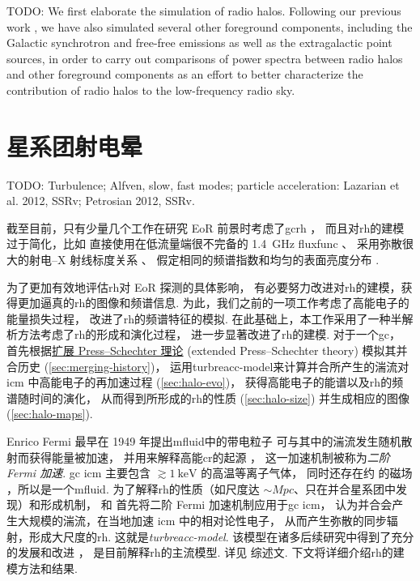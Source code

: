 TODO:
We first elaborate the simulation of radio halos.
Following our previous work \cite{wang2010}, we have also simulated
several other foreground components, including the Galactic synchrotron
and free-free emissions as well as the extragalactic point sources,
in order to carry out comparisons of power spectra between radio halos
and other foreground components as an effort to better characterize the
contribution of radio halos to the low-frequency radio sky.


\section{星系团射电晕}
\label{sec:radio-halos}

TODO: Turbulence; Alfven, slow, fast modes; particle acceleration:
Lazarian et al. 2012, SSRv;
Petrosian 2012, SSRv.

截至目前，只有少量几个工作在研究 EoR 前景时考虑了\ac{gc}\ac{rh}
\cite{diMatteo2004,gleser2008,jelic2008}，
而且对\ac{rh}的建模过于简化，比如
直接使用在低流量端很不完备的 \SI{1.4}{\GHz} \ac{fluxfunc} \cite{gleser2008}、
采用弥散很大的射电--X 射线标度关系 \cite{jelic2008}、
假定相同的频谱指数和均匀的表面亮度分布 \cite{gleser2008,jelic2008}.

为了更加有效地评估\ac{rh}对 EoR 探测的具体影响，
有必要努力改进对\ac{rh}的建模，获得更加逼真的\ac{rh}的图像和频谱信息.
为此，我们之前的一项工作\cite{wang2010}考虑了高能电子的能量损失过程，
改进了\ac{rh}的频谱特征的模拟.
在此基础上，本工作采用了一种半解析方法考虑了\ac{rh}的形成和演化过程，
进一步显著改进了\ac{rh}的建模.
对于一个\ac{gc}，
首先根据\uline{扩展 Press--Schechter 理论} (extended Press--Schechter theory)
模拟其并合历史 (\autoref{sec:merging-history})，
运用\ac{turbreacc-model}来计算并合所产生的湍流对
\ac{icm} 中高能电子的再加速过程 (\autoref{sec:halo-evo})，
获得高能电子的能谱以及\ac{rh}的频谱随时间的演化，
从而得到所形成的\ac{rh}的性质 (\autoref{sec:halo-size})
并生成相应的图像 (\autoref{sec:halo-maps}).

Enrico Fermi 最早在 1949 年提出\ac{mfluid}中的带电粒子
可与其中的湍流发生随机散射而获得能量被加速，
并用来解释高能\ac{cr}的起源 \cite{fermi1949,fermi1954,davis1956}，
这一加速机制被称为\emph{二阶 Fermi 加速}.
\ac{gc} \ac{icm} 主要包含 $\gtrsim \SI{1}{\keV}$ 的高温等离子气体，
同时还存在约 \si{\uG} 的磁场 \cite{govoni2004,ryu2008}，所以是一个\ac{mfluid}.
为了解释\ac{rh}的性质（如尺度达 $\sim\si{Mpc}$、只在并合星系团中发现）和形成机制，
 和 
首先将二阶 Fermi 加速机制应用于\ac{gc} \ac{icm}，
认为并合会产生大规模的湍流，在当地加速 \ac{icm} 中的相对论性电子，
从而产生弥散的同步辐射，形成大尺度的\ac{rh}.
这就是\emph{\ac{turbreacc-model}}.
该模型在诸多后续研究中得到了充分的发展和改进
\cite{fujita2003,brunetti2004,cassano2005,brunetti2007,brunetti2011}，
是目前解释\ac{rh}的主流模型.
详见  综述文.
下文将详细介绍\ac{rh}的建模方法和结果.

